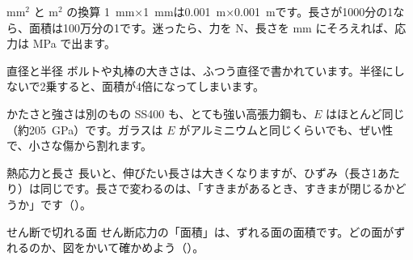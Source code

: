 \begin{tsumazuki}{mm$^2$ と m$^2$ の換算}
\qty{1}{mm}×\qty{1}{mm}は\qty{0.001}{m}×\qty{0.001}{m}です。長さが1000分の1なら、面積は100万分の1です。迷ったら、力を N、長さを mm にそろえれば、応力は MPa で出ます。
\end{tsumazuki}
\begin{tsumazuki}{直径と半径}
ボルトや丸棒の大きさは、ふつう直径で書かれています。半径にしないで2乗すると、面積が4倍になってしまいます。
\end{tsumazuki}
\begin{tsumazuki}{かたさと強さは別のもの}
SS400 も、とても強い高張力鋼も、$E$ はほとんど同じ（約\qty{205}{GPa}）です。ガラスは $E$ がアルミニウムと同じくらいでも、ぜい性で、小さな傷から割れます。
\end{tsumazuki}
\begin{tsumazuki}{熱応力と長さ}
長いと、伸びたい長さは大きくなりますが、ひずみ（長さ1あたり）は同じです。長さで変わるのは、「すきまがあるとき、すきまが閉じるかどうか」です（）。
\end{tsumazuki}
\begin{tsumazuki}{せん断で切れる面}
せん断応力の「面積」は、ずれる面の面積です。どの面がずれるのか、図をかいて確かめよう（）。
\end{tsumazuki}

